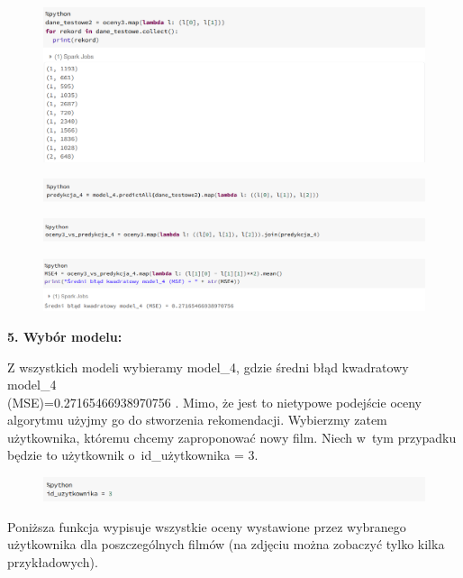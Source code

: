 \documentclass[12pt,a4paper]{report}
\begin{document}
\begin{figure}[H]
\includegraphics[scale=0.5]{obrazy/ALS14.PNG} 
\end{figure}
\begin{figure}[H]
\includegraphics[scale=0.52]{obrazy/ALS19.PNG} 
\end{figure}
\begin{figure}[H]
\includegraphics[scale=0.52]{obrazy/ALS20.PNG} 
\end{figure}
\begin{figure}[H]
\includegraphics[scale=0.52]{obrazy/ALS21.PNG} 
\end{figure}

\textbf{5. Wybór modelu:}

Z wszystkich modeli wybieramy model\_4, gdzie średni błąd kwadratowy model\_4 
\\(MSE)=0.27165466938970756 . Mimo, że jest to nietypowe podejście oceny algorytmu użyjmy go do stworzenia rekomendacji. Wybierzmy zatem użytkownika, któremu chcemy zaproponować nowy film. Niech w~tym przypadku będzie to użytkownik o~id\_użytkownika = 3.

\begin{figure}[H]
\includegraphics[scale=0.5]{obrazy/ALS15.PNG} 
\end{figure}

Poniższa funkcja wypisuje wszystkie oceny wystawione przez wybranego użytkownika dla poszczególnych filmów (na zdjęciu można zobaczyć tylko kilka przykładowych).
\end{document}
